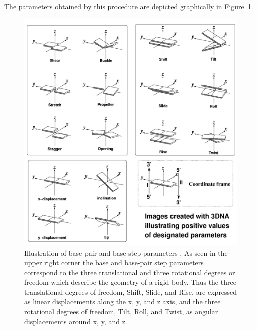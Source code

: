The parameters obtained by  this procedure are depicted graphically in
Figure~\ref{fig:allparam}.
\begin{figure}[htbp]
\centering
\includegraphics[scale=0.53]{Chapter1/allparam2.png}
\caption{Illustration   of   base-pair   and  base   step   parameters
  \cite{lu2003}.   As seen  in the  upper  right corner  the base  and
  base-pair step parameters correspond  to the three translational and
  three rotational degrees or freedom which describe the geometry of a
  rigid-body. Thus the three  translational degrees of freedom, Shift,
  Slide, and Rise, are expressed  as linear displacements along the x,
  y, and z axis,  and the three  rotational degrees of  freedom, Tilt,
  Roll, and Twist, as angular displacements around x, y, and z.}
\label{fig:allparam}
\end{figure}


